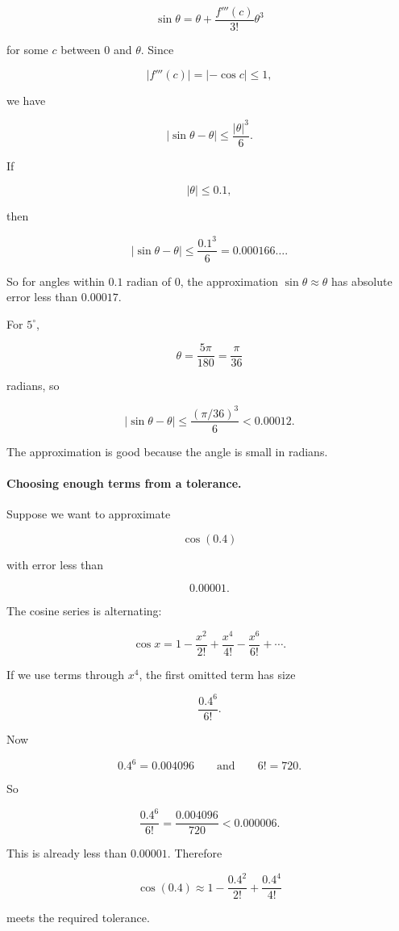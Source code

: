\[
\sin\theta
=
\theta+\frac{f'''(c)}{3!}\theta^3
\]

for some \(c\) between \(0\) and \(\theta\).  Since

\[
|f'''(c)|=|-\cos c|\le1,
\]

we have

\[
\boxed{
|\sin\theta-\theta|\le \frac{|\theta|^3}{6}.
}
\]

If

\[
|\theta|\le0.1,
\]

then

\[
|\sin\theta-\theta|
\le
\frac{0.1^3}{6}
=
0.000166\ldots.
\]

So for angles within \(0.1\) radian of \(0\), the approximation \(\sin\theta\approx\theta\)
has absolute error less than \(0.00017\).

For \(5^\circ\),

\[
\theta=\frac{5\pi}{180}=\frac{\pi}{36}
\]

radians, so

\[
|\sin\theta-\theta|
\le
\frac{(\pi/36)^3}{6}
<0.00012.
\]

The approximation is good because the angle is small in radians.

\paragraph{Choosing enough terms from a tolerance.}
Suppose we want to approximate

\[
\cos(0.4)
\]

with error less than

\[
0.00001.
\]

The cosine series is alternating:

\[
\cos x
=
1-\frac{x^2}{2!}+\frac{x^4}{4!}-\frac{x^6}{6!}+\cdots.
\]

If we use terms through \(x^4\), the first omitted term has size

\[
\frac{0.4^6}{6!}.
\]

Now

\[
0.4^6=0.004096
\qquad\text{and}\qquad
6!=720.
\]

So

\[
\frac{0.4^6}{6!}
=
\frac{0.004096}{720}
<0.000006.
\]

This is already less than \(0.00001\).  Therefore

\[
\cos(0.4)
\approx
1-\frac{0.4^2}{2!}+\frac{0.4^4}{4!}
\]

meets the required tolerance.

